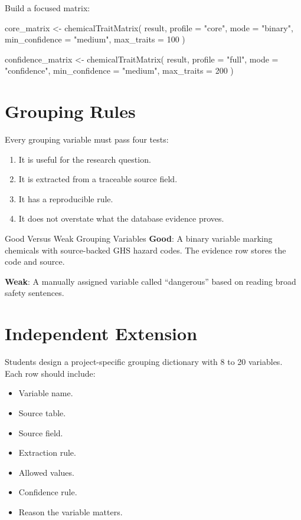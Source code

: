 Build a focused matrix:

\begin{rcode}
core_matrix <- chemicalTraitMatrix(
  result,
  profile = "core",
  mode = "binary",
  min_confidence = "medium",
  max_traits = 100
)

confidence_matrix <- chemicalTraitMatrix(
  result,
  profile = "full",
  mode = "confidence",
  min_confidence = "medium",
  max_traits = 200
)
\end{rcode}

\section{Grouping Rules}
Every grouping variable must pass four tests:
\begin{enumerate}
  \item It is useful for the research question.
  \item It is extracted from a traceable source field.
  \item It has a reproducible rule.
  \item It does not overstate what the database evidence proves.
\end{enumerate}

\begin{goldbox}{Good Versus Weak Grouping Variables}
\textbf{Good}: A binary variable marking chemicals with source-backed GHS hazard codes. The evidence row stores the code and source.

\textbf{Weak}: A manually assigned variable called ``dangerous'' based on reading broad safety sentences.
\end{goldbox}

\section{Independent Extension}
Students design a project-specific grouping dictionary with 8 to 20 variables. Each row should include:
\begin{itemize}
  \item Variable name.
  \item Source table.
  \item Source field.
  \item Extraction rule.
  \item Allowed values.
  \item Confidence rule.
  \item Reason the variable matters.
\end{itemize}

